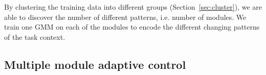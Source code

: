 By clustering the training data into different groups (Section~\ref{sec:cluster}), we are able to discover the number of different patterns, i.e. number of modules. We train one GMM on each of the modules to encode the different changing patterns of the task context.







\subsection{Multiple module adaptive control}
\label{sec:control}


